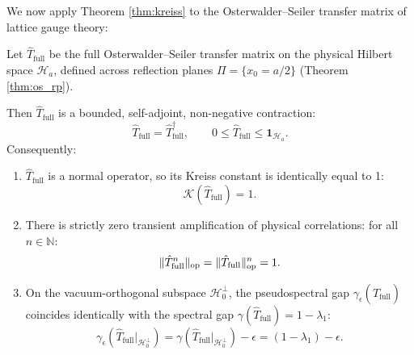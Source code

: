 We now apply Theorem \ref{thm:kreiss} to the Osterwalder--Seiler transfer matrix of lattice gauge theory:

\begin{corollary}
\label{cor:transfer_normality}
Let $\hat{T}_{\mathrm{full}}$ be the full Osterwalder--Seiler transfer matrix on the physical Hilbert space $\mathcal{H}_a$, defined across reflection planes $\Pi = \{x_0 = a/2\}$ (Theorem \ref{thm:os_rp}).

Then $\hat{T}_{\mathrm{full}}$ is a bounded, self-adjoint, non-negative contraction:
\begin{equation}
\label{eq:transfer_selfadjoint_contraction}
\hat{T}_{\mathrm{full}} = \hat{T}_{\mathrm{full}}^\dagger, \qquad 0 \le \hat{T}_{\mathrm{full}} \le \mathbf{1}_{\mathcal{H}_a}.
\end{equation}
Consequently:
\begin{enumerate}
    \item $\hat{T}_{\mathrm{full}}$ is a normal operator, so its Kreiss constant is identically equal to 1:
    \begin{equation}
    \label{eq:kreiss_constant_one}
    \mathcal{K}(\hat{T}_{\mathrm{full}}) = 1.
    \end{equation}
    \item There is strictly zero transient amplification of physical correlations: for all $n \in \mathbb{N}$:
    \begin{equation}
    \label{eq:no_transient_growth}
    \|\hat{T}_{\mathrm{full}}^n\|_{\mathrm{op}} = \|\hat{T}_{\mathrm{full}}\|_{\mathrm{op}}^n = 1.
    \end{equation}
    \item On the vacuum-orthogonal subspace $\mathcal{H}_0^\perp$, the pseudospectral gap $\gamma_\epsilon(\hat{T}_{\mathrm{full}})$ coincides identically with the spectral gap $\gamma(\hat{T}_{\mathrm{full}}) = 1 - \lambda_1$:
    \begin{equation}
    \label{eq:pseudospectral_gap_exact}
    \gamma_\epsilon(\hat{T}_{\mathrm{full}}|_{\mathcal{H}_0^\perp}) = \gamma(\hat{T}_{\mathrm{full}}|_{\mathcal{H}_0^\perp}) - \epsilon = (1 - \lambda_1) - \epsilon.
    \end{equation}
\end{enumerate}
\end{corollary}

